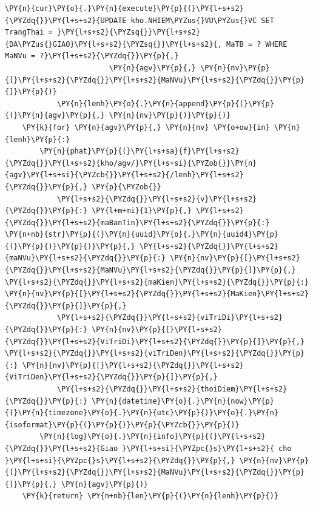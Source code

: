 \begin{Verbatim}[commandchars=\\\{\},frame=single,framerule=0.3pt,rulecolor=\color{black!40},fontsize=\footnotesize,breaklines=true]
            \PY{n}{cur}\PY{o}{.}\PY{n}{execute}\PY{p}{(}\PY{l+s+s2}{\PYZdq{}}\PY{l+s+s2}{UPDATE kho.NHIEM\PYZus{}VU\PYZus{}VC SET TrangThai = }\PY{l+s+s2}{\PYZsq{}}\PY{l+s+s2}{DA\PYZus{}GIAO}\PY{l+s+s2}{\PYZsq{}}\PY{l+s+s2}{, MaTB = ? WHERE MaNVu = ?}\PY{l+s+s2}{\PYZdq{}}\PY{p}{,}
                        \PY{n}{agv}\PY{p}{,} \PY{n}{nv}\PY{p}{[}\PY{l+s+s2}{\PYZdq{}}\PY{l+s+s2}{MaNVu}\PY{l+s+s2}{\PYZdq{}}\PY{p}{]}\PY{p}{)}
            \PY{n}{lenh}\PY{o}{.}\PY{n}{append}\PY{p}{(}\PY{p}{(}\PY{n}{agv}\PY{p}{,} \PY{n}{nv}\PY{p}{)}\PY{p}{)}
    \PY{k}{for} \PY{n}{agv}\PY{p}{,} \PY{n}{nv} \PY{o+ow}{in} \PY{n}{lenh}\PY{p}{:}
        \PY{n}{phat}\PY{p}{(}\PY{l+s+sa}{f}\PY{l+s+s2}{\PYZdq{}}\PY{l+s+s2}{kho/agv/}\PY{l+s+si}{\PYZob{}}\PY{n}{agv}\PY{l+s+si}{\PYZcb{}}\PY{l+s+s2}{/lenh}\PY{l+s+s2}{\PYZdq{}}\PY{p}{,} \PY{p}{\PYZob{}}
            \PY{l+s+s2}{\PYZdq{}}\PY{l+s+s2}{v}\PY{l+s+s2}{\PYZdq{}}\PY{p}{:} \PY{l+m+mi}{1}\PY{p}{,} \PY{l+s+s2}{\PYZdq{}}\PY{l+s+s2}{maBanTin}\PY{l+s+s2}{\PYZdq{}}\PY{p}{:} \PY{n+nb}{str}\PY{p}{(}\PY{n}{uuid}\PY{o}{.}\PY{n}{uuid4}\PY{p}{(}\PY{p}{)}\PY{p}{)}\PY{p}{,} \PY{l+s+s2}{\PYZdq{}}\PY{l+s+s2}{maNVu}\PY{l+s+s2}{\PYZdq{}}\PY{p}{:} \PY{n}{nv}\PY{p}{[}\PY{l+s+s2}{\PYZdq{}}\PY{l+s+s2}{MaNVu}\PY{l+s+s2}{\PYZdq{}}\PY{p}{]}\PY{p}{,} \PY{l+s+s2}{\PYZdq{}}\PY{l+s+s2}{maKien}\PY{l+s+s2}{\PYZdq{}}\PY{p}{:} \PY{n}{nv}\PY{p}{[}\PY{l+s+s2}{\PYZdq{}}\PY{l+s+s2}{MaKien}\PY{l+s+s2}{\PYZdq{}}\PY{p}{]}\PY{p}{,}
            \PY{l+s+s2}{\PYZdq{}}\PY{l+s+s2}{viTriDi}\PY{l+s+s2}{\PYZdq{}}\PY{p}{:} \PY{n}{nv}\PY{p}{[}\PY{l+s+s2}{\PYZdq{}}\PY{l+s+s2}{ViTriDi}\PY{l+s+s2}{\PYZdq{}}\PY{p}{]}\PY{p}{,} \PY{l+s+s2}{\PYZdq{}}\PY{l+s+s2}{viTriDen}\PY{l+s+s2}{\PYZdq{}}\PY{p}{:} \PY{n}{nv}\PY{p}{[}\PY{l+s+s2}{\PYZdq{}}\PY{l+s+s2}{ViTriDen}\PY{l+s+s2}{\PYZdq{}}\PY{p}{]}\PY{p}{,}
            \PY{l+s+s2}{\PYZdq{}}\PY{l+s+s2}{thoiDiem}\PY{l+s+s2}{\PYZdq{}}\PY{p}{:} \PY{n}{datetime}\PY{o}{.}\PY{n}{now}\PY{p}{(}\PY{n}{timezone}\PY{o}{.}\PY{n}{utc}\PY{p}{)}\PY{o}{.}\PY{n}{isoformat}\PY{p}{(}\PY{p}{)}\PY{p}{\PYZcb{}}\PY{p}{)}
        \PY{n}{log}\PY{o}{.}\PY{n}{info}\PY{p}{(}\PY{l+s+s2}{\PYZdq{}}\PY{l+s+s2}{Giao }\PY{l+s+si}{\PYZpc{}s}\PY{l+s+s2}{ cho }\PY{l+s+si}{\PYZpc{}s}\PY{l+s+s2}{\PYZdq{}}\PY{p}{,} \PY{n}{nv}\PY{p}{[}\PY{l+s+s2}{\PYZdq{}}\PY{l+s+s2}{MaNVu}\PY{l+s+s2}{\PYZdq{}}\PY{p}{]}\PY{p}{,} \PY{n}{agv}\PY{p}{)}
    \PY{k}{return} \PY{n+nb}{len}\PY{p}{(}\PY{n}{lenh}\PY{p}{)}



\end{Verbatim}

